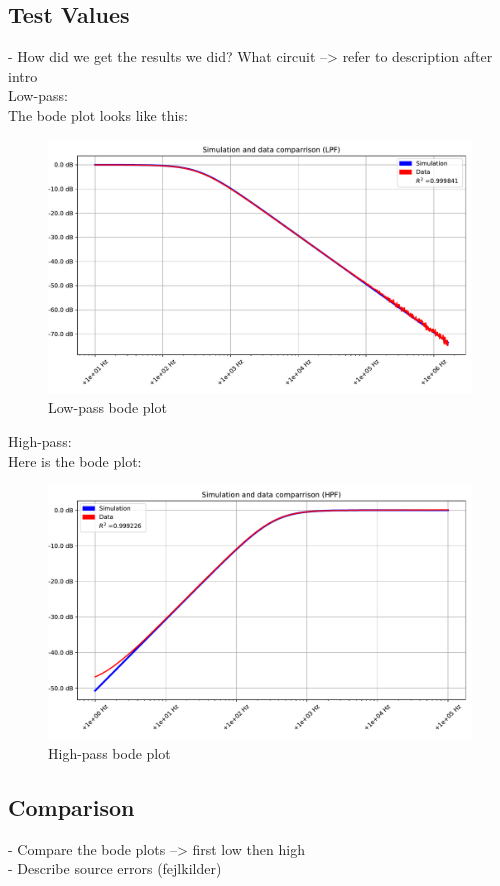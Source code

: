 \subsection{Test Values}
- How did we get the results we did? What circuit --> refer to description after intro \\
Low-pass: \\
The bode plot looks like this:
\begin{figure}[H]
\center
	\includegraphics[scale=0.5]{fig/img/bode_LPF_plot.pdf}
	\caption{Low-pass bode plot}
	\label{lp:bode}
\end{figure}
High-pass: \\
Here is the bode plot:
\begin{figure}[H]
\center
	\includegraphics[scale=0.5]{fig/img/bode_HPF_plot.pdf}
	\caption{High-pass bode plot}
	\label{hp:bode}
\end{figure}
\subsection{Comparison}
- Compare the bode plots --> first low then high \\
- Describe source errors (fejlkilder)
